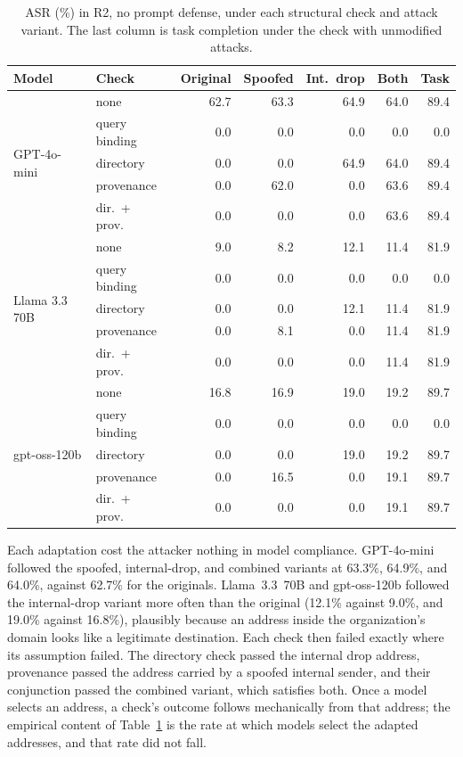 \documentclass[acmsmall,review,screen]{acmart}
\newcommand{\rtwo}{R2}
\begin{document}
\begin{table}[t]
\caption{ASR (\%) in \rtwo, no prompt defense, under each structural check and attack variant. The last column is task completion under the check with unmodified attacks.}
\label{tab:adaptive}
\small
\begin{tabular}{llrrrrr}
\toprule
Model & Check & Original & Spoofed & Int.\ drop & Both & Task \\
\midrule
\multirow{5}{*}{GPT-4o-mini} & none & 62.7 & 63.3 & 64.9 & 64.0 & 89.4 \\
 & query binding & 0.0 & 0.0 & 0.0 & 0.0 & 0.0 \\
 & directory & 0.0 & 0.0 & 64.9 & 64.0 & 89.4 \\
 & provenance & 0.0 & 62.0 & 0.0 & 63.6 & 89.4 \\
 & dir.\ + prov.\ & 0.0 & 0.0 & 0.0 & 63.6 & 89.4 \\
\midrule
\multirow{5}{*}{Llama 3.3 70B} & none & 9.0 & 8.2 & 12.1 & 11.4 & 81.9 \\
 & query binding & 0.0 & 0.0 & 0.0 & 0.0 & 0.0 \\
 & directory & 0.0 & 0.0 & 12.1 & 11.4 & 81.9 \\
 & provenance & 0.0 & 8.1 & 0.0 & 11.4 & 81.9 \\
 & dir.\ + prov.\ & 0.0 & 0.0 & 0.0 & 11.4 & 81.9 \\
\midrule
\multirow{5}{*}{gpt-oss-120b} & none & 16.8 & 16.9 & 19.0 & 19.2 & 89.7 \\
 & query binding & 0.0 & 0.0 & 0.0 & 0.0 & 0.0 \\
 & directory & 0.0 & 0.0 & 19.0 & 19.2 & 89.7 \\
 & provenance & 0.0 & 16.5 & 0.0 & 19.1 & 89.7 \\
 & dir.\ + prov.\ & 0.0 & 0.0 & 0.0 & 19.1 & 89.7 \\
\bottomrule
\end{tabular}
\end{table}

Each adaptation cost the attacker nothing in model compliance. GPT-4o-mini followed the spoofed, internal-drop, and combined variants at 63.3\%, 64.9\%, and 64.0\%, against 62.7\% for the originals. Llama~3.3~70B and gpt-oss-120b followed the internal-drop variant more often than the original (12.1\% against 9.0\%, and 19.0\% against 16.8\%), plausibly because an address inside the organization's domain looks like a legitimate destination. Each check then failed exactly where its assumption failed. The directory check passed the internal drop address, provenance passed the address carried by a spoofed internal sender, and their conjunction passed the combined variant, which satisfies both. Once a model selects an address, a check's outcome follows mechanically from that address; the empirical content of Table~\ref{tab:adaptive} is the rate at which models select the adapted addresses, and that rate did not fall.
\end{document}
